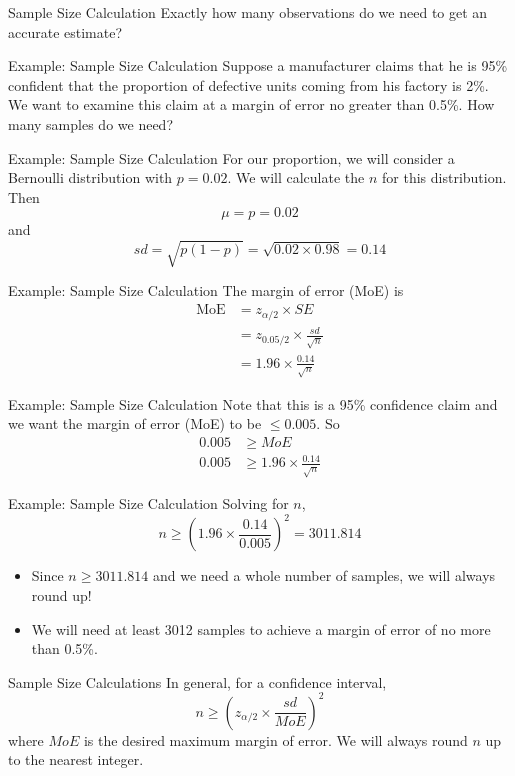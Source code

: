 \begin{frame}{Sample Size Calculation}
    Exactly how many observations do we need to get an accurate estimate?
\end{frame}

\begin{frame}{Example: Sample Size Calculation}
    Suppose a manufacturer claims that he is 95\% confident that the proportion of defective units coming from his factory is 2\%. We want to examine this claim at a margin of error no greater than 0.5\%. How many samples do we need?
\end{frame}

\begin{frame}{Example: Sample Size Calculation}
    For our proportion, we will consider a Bernoulli distribution with $p=0.02$. We will calculate the $n$ for this distribution. Then
    \[
        \mu = p = 0.02
    \]
    and
    \[
        sd = \sqrt{p(1-p)} = \sqrt{0.02\times0.98} = 0.14
    \]
\end{frame}

\begin{frame}{Example: Sample Size Calculation}
    The margin of error (MoE) is 
    \begin{align*}
        \text{MoE} &= z_{\alpha/2}\times SE \\
        &= z_{0.05/2}\times\frac{sd}{\sqrt{n}} \\
        &= 1.96 \times \frac{0.14}{\sqrt{n}}
    \end{align*}
\end{frame}

\begin{frame}{Example: Sample Size Calculation}
    Note that this is a 95\% confidence claim and we want the margin of error (MoE) to be $\le0.005$. So
    \begin{align*}
        0.005 &\ge MoE \\
        0.005 &\ge 1.96 \times \frac{0.14}{\sqrt{n}}
    \end{align*}
\end{frame}

\begin{frame}{Example: Sample Size Calculation}
    Solving for $n$,
    \[
        n \ge \left(1.96 \times \frac{0.14}{0.005}\right)^2 = 3011.814
    \]
    \begin{itemize}
        \item Since $n \ge 3011.814$ and we need a whole number of samples, we will always round up! 
        \item We will need at least 3012 samples to achieve a margin of error of no more than 0.5\%.
    \end{itemize}
\end{frame}

\begin{frame}{Sample Size Calculations}
    In general, for a confidence interval,
    \[
        n \ge \left(z_{\alpha/2}\times\frac{sd}{MoE}\right)^2
    \]
    where $MoE$ is the desired maximum margin of error. We will always round $n$ up to the nearest integer.
\end{frame}